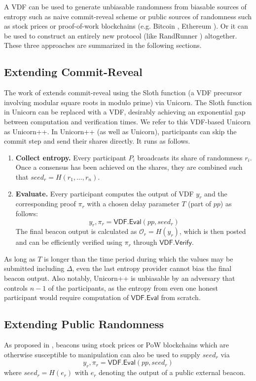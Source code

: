 \documentclass[letterpaper,twocolumn,10pt]{article}
\theoremstyle{definition}
\theoremstyle{remark}
\begin{document}
A VDF can be used to generate unbiasable randomness from biasable sources of entropy such as naive commit-reveal scheme or public sources of randomness such as stock prices or proof-of-work blockchains (e.g. Bitcoin \cite{nakamoto2019bitcoin}, Ethereum \cite{wood2014ethereum}). Or it can be used to construct an entirely new protocol (like RandRunner \cite{schindler2021randrunner}) altogether. These three approaches are summarized in the following sections.

\subsection{Extending Commit-Reveal}
\label{subsection:extending-commit-reveal}
The work of \cite{lenstra2015random} extends commit-reveal using the Sloth function (a VDF precursor involving modular square roots in modulo prime) via Unicorn. The Sloth function in Unicorn can be replaced with a VDF, desirably achieving an exponential gap between computation and verification times. We refer to this VDF-based Unicorn as Unicorn++. In Unicorn++ (as well as Unicorn), participants can skip the commit step and send their shares directly. It runs as follows.
\begin{enumerate}
    \item \textbf{Collect entropy.} Every participant $P_i$ broadcasts its share of randomness $r_i$. Once a consensus has been achieved on the shares, they are combined such that $seed_r = H(r_1,\ldots, r_n)$.
    \item \textbf{Evaluate.} Every participant computes the output of VDF $y_r$ and the corresponding proof $\pi_r$ with a chosen delay parameter $T$ (part of $pp$) as follows:
    $$y_r, \pi_r = \mathsf{VDF.Eval}(pp, seed_r)$$
    The final beacon output is calculated as $\mathcal{O}_r = H(y_r) $, which is then posted and can be efficiently verified using $\pi_r$ through $\mathsf{VDF.Verify}$.
\end{enumerate}
As long as $T$ is longer than the time period during which the values may be submitted including $\Delta$, even the last entropy provider cannot bias the final beacon output. Also notably, Unicorn++ is unbiasable by an adversary that controls $n - 1$ of the participants, as the entropy from even one honest participant would require computation of $\mathsf{VDF.Eval}$ from scratch.

\subsection{Extending Public Randomness}
As proposed in \cite{bunz2017proofs, bonneau2015bitcoin}, beacons using stock prices \cite{clark2010use} or PoW blockchains \cite{bonneau2015bitcoin} which are otherwise susceptible to manipulation can also be used to supply $seed_r$ via
$$y_r, \pi_r = \mathsf{VDF.Eval}(pp, seed_r)$$
where $seed_r = H(e_r)$ with $e_r$ denoting the output of a public external beacon.
\end{document}
